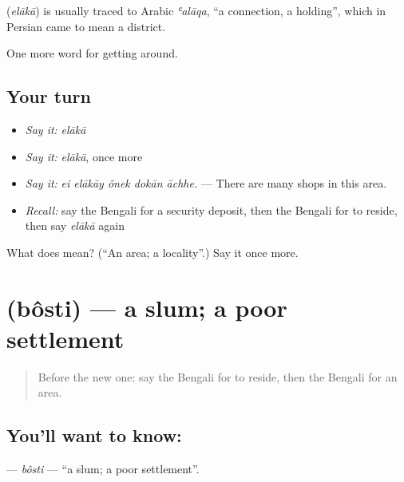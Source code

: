 \begin{cousinweb}
\textbf{} (\emph{elākā}) is usually traced to Arabic \emph{ʿalāqa}, \textquotedblleft{}a connection, a holding\textquotedblright{}, which in Persian came to mean a district.
\end{cousinweb}

\begin{grammarlens}[title={What you've built}]
One more word for getting around.
\end{grammarlens}

\subsection*{Your turn}
\begin{itemize}
\raggedright
  \item \emph{Say it:} \emph{elākā}
  \item \emph{Say it:} \emph{elākā}, once more
  \item \emph{Say it:} \emph{ei elākāy ônek dokān āchhe.} — There are many shops in this area.
  \item \emph{Recall:} say the Bengali for a security deposit, then the Bengali for to reside, then say \emph{elākā} again
\end{itemize}

\begin{tcolorbox}[breakable,colback=teal!4,colframe=teal!35!black,title={Before you move on}]
What does  mean? (\textquotedblleft{}An area; a locality\textquotedblright{}.) Say it once more.
\end{tcolorbox}
\section[\texorpdfstring{\bn{বস্তি} (bôsti)}{বস্তি (bôsti)}]{ (bôsti) — a slum; a poor settlement}

\label{lesson:BN-C409-bosti}



\begin{quote}
Before the new one: say the Bengali for to reside, then the Bengali for an area.
\end{quote}

\subsection*{You'll want to know: }
\textbf{} — \emph{bôsti} — \textquotedblleft{}a slum; a poor settlement\textquotedblright{}.

